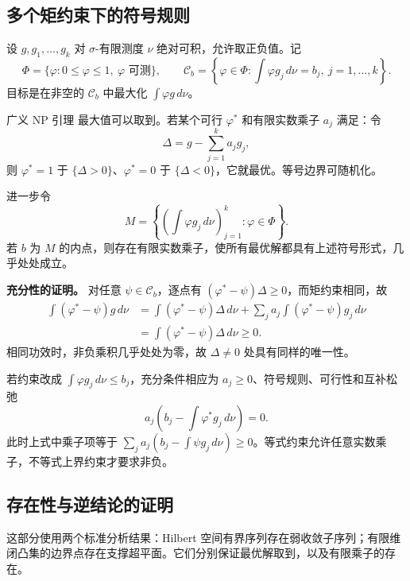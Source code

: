 \subsection{多个矩约束下的符号规则}

设 $g,g_1,\ldots,g_k$ 对 $\sigma$-有限测度 $\nu$ 绝对可积，允许取正负值。记
\[
 \Phi=\{\varphi:0\le\varphi\le1,\ \varphi\text{ 可测}\},\qquad
 \mathcal C_b=\left\{\varphi\in\Phi:
       \int\varphi g_j\,d\nu=b_j,\ j=1,\ldots,k\right\}.
\]
目标是在非空的 $\mathcal C_b$ 中最大化 $\int\varphi g\,d\nu$。

\begin{definitionbox}{广义 NP 引理}
最大值可以取到。若某个可行 $\varphi^*$ 和有限实数乘子 $a_j$ 满足：令
\[
 \Delta=g-\sum_{j=1}^k a_jg_j,
\]
则 $\varphi^*=1$ 于 $\{\Delta>0\}$、$\varphi^*=0$ 于 $\{\Delta<0\}$，它就最优。等号边界可随机化。

进一步令
\[
 M=\left\{\left(\int\varphi g_j\,d\nu\right)_{j=1}^k:
                    \varphi\in\Phi\right\}.
\]
若 $b$ 为 $M$ 的内点，则存在有限实数乘子，使所有最优解都具有上述符号形式，几乎处处成立。
\end{definitionbox}

\textbf{充分性的证明。}
对任意 $\psi\in\mathcal C_b$，逐点有 $(\varphi^*-\psi)\Delta\ge0$，而矩约束相同，故
\begin{align*}
 \int(\varphi^*-\psi)g\,d\nu
 &=\int(\varphi^*-\psi)\Delta\,d\nu
   +\sum_j a_j\int(\varphi^*-\psi)g_j\,d\nu\\
 &=\int(\varphi^*-\psi)\Delta\,d\nu\ge0.
\end{align*}
相同功效时，非负乘积几乎处处为零，故 $\Delta\ne0$ 处具有同样的唯一性。

若约束改成 $\int\varphi g_j\,d\nu\le b_j$，充分条件相应为 $a_j\ge0$、符号规则、可行性和互补松弛
\[
 a_j\left(b_j-\int\varphi^*g_j\,d\nu\right)=0.
\]
此时上式中乘子项等于 $\sum_j a_j(b_j-\int\psi g_j\,d\nu)\ge0$。等式约束允许任意实数乘子，不等式上界约束才要求非负。

\subsection{存在性与逆结论的证明}

这部分使用两个标准分析结果：Hilbert 空间有界序列存在弱收敛子序列；有限维闭凸集的边界点存在支撑超平面。它们分别保证最优解取到，以及有限乘子的存在。

